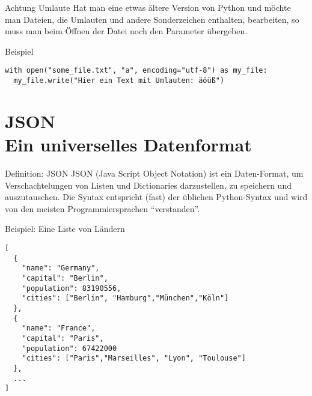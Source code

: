 \begin{fragile}
	
\begin{alertblock}{Achtung Umlaute}
\vspace{2pt}
Hat man eine etwas ältere Version von Python und möchte man Dateien, die Umlauten und andere Sonderzeichen enthalten, bearbeiten, so muss man beim Öffnen der Datei noch den Parameter  übergeben. 
\end{alertblock}	

 \vspace{12pt}
 
\begin{exampleblock}{Beispiel}
	\vspace{2pt}
\begin{verbatim}
with open("some_file.txt", "a", encoding="utf-8") as my_file:
  my_file.write("Hier ein Text mit Umlauten: äöüß")
\end{verbatim}
\end{exampleblock}
\end{fragile}





\section{JSON \\ \footnotesize Ein universelles Datenformat}

\begin{frame}

\begin{block}{Definition: JSON}
\vspace{2pt}	
JSON (Java Script Object Notation) ist ein Daten-Format, um Verschachtelungen von Listen und Dictionaries darzustellen, zu speichern und auszutauschen. Die Syntax entspricht (fast) der üblichen Python-Syntax und wird von den meisten Programmiersprachen \enquote{verstanden}.  
\end{block}
\end{frame}

\begin{fragile}
	
\begin{exampleblock}{Beispiel: Eine Liste von Ländern}
\vspace{2pt}
\begin{verbatim}
[
  {
    "name": "Germany",
    "capital": "Berlin",
    "population": 83190556,
    "cities": ["Berlin", "Hamburg","München","Köln"] 
  },
  {
    "name": "France", 
    "capital": "Paris",
    "population": 67422000
    "cities": ["Paris","Marseilles", "Lyon", "Toulouse"]
  },
  ...
]
\end{verbatim}
\end{exampleblock}
\end{fragile}

